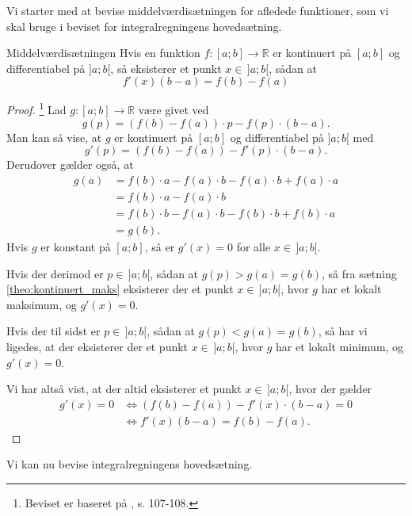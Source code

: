 Vi starter med at bevise middelværdisætningen for afledede funktioner, som vi skal bruge i beviset for integralregningens hovedsætning.

\begin{theorem}[label=theo:middelværdi]{Middelværdisætningen}{}
  Hvis en funktion $f:[a;b]\to \mathbb{R}$ er kontinuert på $[a;b]$ og differentiabel på $]a;b[$, så eksisterer et punkt $x \in \,]a;b[$, sådan at
  \[
  f'(x)(b-a)=f(b)-f(a)
  \] 
\end{theorem}
\begin{proof} 
  \footnote{Beviset er baseret på \cite{Rudin1976}, s. 107-108.}
  Lad $g:[a;b]\to \mathbb{R}$ være givet ved 
  \[
  g(p)=(f(b)-f(a)) \cdot p - f(p)\cdot(b-a).
  \] 
  Man kan så vise, at $g$ er kontinuert på $[a;b]$ og differentiabel på $]a;b[$ med
  \[
  g'(p)=(f(b)-f(a)) - f'(p) \cdot (b-a).
  \] 
Derudover gælder også, at
\begin{equation*}
\begin{split}
  g(a)&=f(b) \cdot a -f(a)\cdot b - f(a) \cdot b + f(a) \cdot a \\
  &=f(b) \cdot a - f(a) \cdot b\\
  &=f(b) \cdot b - f(a) \cdot b - f(b) \cdot b + f(b) \cdot a \\
  &= g(b).
\end{split}
\end{equation*}
  Hvis $g$ er konstant på $[a;b]$, så er $g'(x)=0$ for alle $x \in \,]a;b[$. 

  \noindent Hvis der derimod er $p \in \,]a;b[$, sådan at $g(p)>g(a)=g(b)$, så fra sætning \ref{theo:kontinuert_maks} eksisterer der et punkt $x \in \,]a;b[$, hvor $g$ har et lokalt maksimum, og $g'(x)=0$. 

  \noindent Hvis der til sidst er $p \in \,]a;b[$, sådan at $g(p)<g(a)=g(b)$, så har vi ligedes, at der eksisterer der et punkt $x \in \,]a;b[$, hvor $g$ har et lokalt minimum, og $g'(x)=0$. 
 
  Vi har altså vist, at der altid eksisterer et punkt $x \in \, ]a;b[$, hvor der gælder
  \begin{equation*}
  \begin{split}
    g'(x)=0 &\iff (f(b)-f(a)) - f'(x) \cdot (b-a)=0 \\
    &\iff f'(x)(b-a)=f(b)-f(a).
  \end{split}
  \end{equation*}
\end{proof}

Vi kan nu bevise integralregningens hovedsætning.

